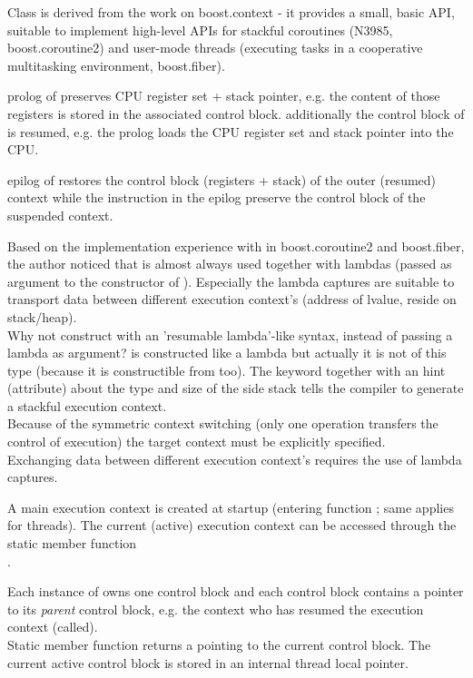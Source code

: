 Class \ectx is derived from the work on boost.context\cite{bcontext} - it
provides a small, basic API, suitable to implement high-level APIs for stackful
coroutines (N3985\cite{N3985}, boost.coroutine2\cite{bcoroutine2}) and user-mode
threads (executing tasks in a cooperative multitasking environment,
boost.fiber\cite{bfiber}).

prolog of  preserves CPU register set + stack pointer, e.g.
the content of those registers is stored in the associated control block. additionally the
control block of  is resumed, e.g. the prolog loads the CPU register set and stack pointer
into the CPU.

epilog of  restores the control block (registers + stack) of
the outer (resumed) context while the instruction in the epilog preserve the control block
of the suspended context.

Based on the implementation experience with  in
boost.coroutine2\cite{bcoroutine2} and boost.fiber\cite{bfiber}, the author
noticed that  is almost always used together with lambdas
(passed as argument to the constructor of ). Especially
the lambda captures are suitable to transport data between different execution
context's (address of lvalue, reside on stack/heap).\\
Why not construct \ectx with an 'resumable lambda'-like syntax, instead of
passing a lambda as argument? \ectx is constructed like a lambda but actually it
is not of this type (because it is constructible from \ectxcurrent too).
The keyword \resumable together with an hint (attribute) about the type and size
of the side stack tells the compiler to generate a stackful execution context.\\
Because of the symmetric context switching (only one operation transfers the
control of execution) the target context must be explicitly specified.\\
Exchanging data between different execution context's requires the use of lambda
captures.

A main execution context is created at startup (entering function \main; same
applies for threads). The current (active) execution context can be accessed
through the static member function\\
\ectxcurrent.

Each instance of \ectx owns one control block and each control block contains a
pointer to its \emph{parent} control block, e.g. the context who has resumed the
execution context (\ectxop called).\\
Static member function \ectxcurrent returns a \ectx pointing to the current
control block. The current active control block is stored in an internal thread
local pointer.

